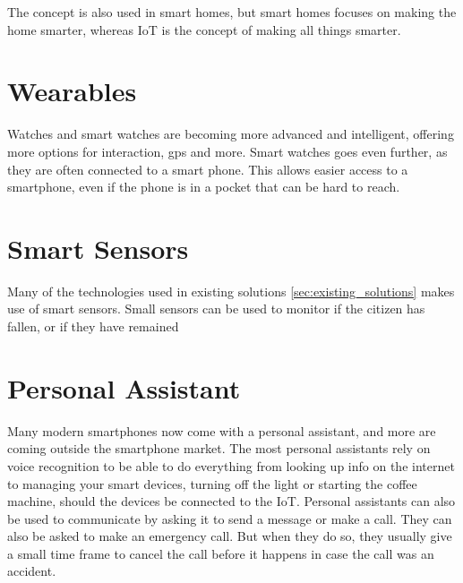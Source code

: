 The concept is also used in smart homes, but smart homes focuses on making the home smarter, whereas IoT is the concept of making all things smarter.


\section{Wearables}
Watches and smart watches are becoming more advanced and intelligent, offering more options for interaction, gps and more. Smart watches goes even further, as they are often connected to a smart phone. This allows easier access to a smartphone, even if the phone is in a pocket that can be hard to reach.

\section{Smart Sensors}
Many of the technologies used in existing solutions \ref{sec:existing_solutions} makes use of smart sensors. Small sensors can be used to monitor if the citizen has fallen, or if they have remained 


\section{Personal Assistant}
Many modern smartphones now come with a personal assistant, and more are coming outside the smartphone market. The most personal assistants rely on voice recognition to be able to do everything from looking up info on the internet to managing your smart devices, turning off the light or starting the coffee machine, should the devices be connected to the IoT. Personal assistants can also be used to communicate by asking it to send a message or make a call. They can also be asked to make an emergency call. But when they do so, they usually give a small time frame to cancel the call before it happens in case the call was an accident.

